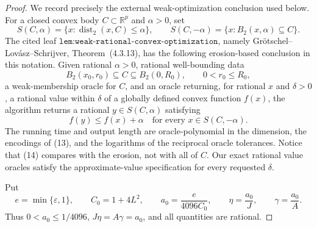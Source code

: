 \documentclass{article}
\begin{document}
\begin{proof}
We record precisely the external weak-optimization conclusion used below.  For a closed convex body \(C\subset\mathbb R^p\) and \(\alpha>0\), set
\[
 S(C,\alpha)=\{x:\operatorname{dist}_2(x,C)\le\alpha\},
 \qquad
 S(C,-\alpha)=\{x:B_2(x,\alpha)\subseteq C\}.
\tag{12}
\]
The cited leaf \(\texttt{lem:weak-rational-convex-optimization}\), namely Gr\"otschel--Lov\'asz--Schrijver, Theorem~(4.3.13), has the following erosion-based conclusion in this notation.  Given rational \(\alpha>0\), rational well-bounding data
\[
 B_2(x_0,r_0)\subseteq C\subseteq B_2(0,R_0),
 \qquad 0<r_0\le R_0,
\tag{13}
\]
a weak-membership oracle for \(C\), and an oracle returning, for rational \(x\) and \(\delta>0\), a rational value within \(\delta\) of a globally defined convex function \(f(x)\), the algorithm returns a rational \(y\in S(C,\alpha)\) satisfying
\[
 f(y)\le f(x)+\alpha
 \quad\text{for every }x\in S(C,-\alpha).
\tag{14}
\]
The running time and output length are oracle-polynomial in the dimension, the encodings of (13), and the logarithms of the reciprocal oracle tolerances.  Notice that (14) compares with the erosion, not with all of \(C\).  Our exact rational value oracles satisfy the approximate-value specification for every requested \(\delta\).

Put
\[
 e=\min\{\varepsilon,1\},
 \qquad C_0=1+4L^2,
 \qquad a_0=\frac{e}{4096C_0},
 \qquad \eta=\frac{a_0}{J},
 \qquad \gamma=\frac{a_0}{A}.
\tag{15}
\]
Thus \(0<a_0\le1/4096\), \(J\eta=A\gamma=a_0\), and all quantities are rational.


\end{proof}
\end{document}
